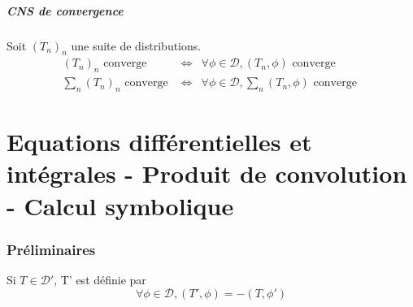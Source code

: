 \documentclass{article}
\begin{document}
\subsubsection{CNS de convergence}
{Soit $(T_n)_n$ une suite de distributions.
\begin{eqnarray*}
(T_n)_n \text{ converge } &\Leftrightarrow& \forall \phi \in \mathcal{D}, (T_n,\phi) \text{ converge } \\
\sum_n (T_n)_n \text{ converge } &\Leftrightarrow& \forall \phi \in \mathcal{D}, \sum_n (T_n,\phi) \text{ converge } 
\end{eqnarray*}
}

\newpage
\part{Equations différentielles et intégrales - Produit de convolution - Calcul symbolique}

\section{Préliminaires}
\begin{rap}
Si $T\in\mathcal{D}'$, T' est définie par \[\forall \phi \in \mathcal{D}, (T',\phi)=-(T,\phi')\]
\end{rap}

\end{document}
